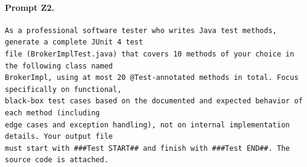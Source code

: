 \paragraph*{Prompt Z2.}
\label{prompt:z2}
\begin{lstlisting}
As a professional software tester who writes Java test methods, generate a complete JUnit 4 test
file (BrokerImplTest.java) that covers 10 methods of your choice in the following class named
BrokerImpl, using at most 20 @Test-annotated methods in total. Focus specifically on functional,
black-box test cases based on the documented and expected behavior of each method (including
edge cases and exception handling), not on internal implementation details. Your output file
must start with ###Test START## and finish with ###Test END##. The source code is attached.
\end{lstlisting}

